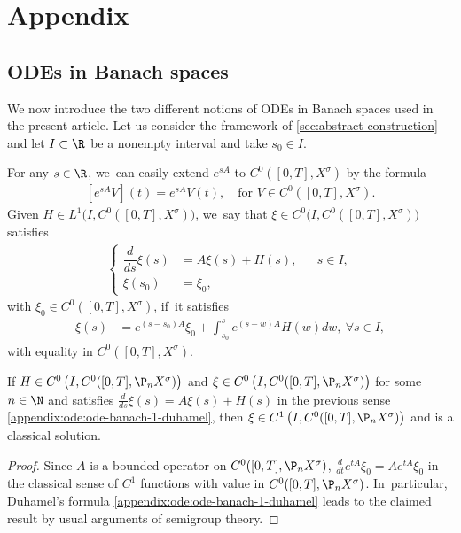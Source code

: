 \appendix
\setcounter{theorem}{0}
\renewcommand{\thetheorem}{A.\arabic{theorem}}
\renewcommand{\theequation}{A.\arabic{equation}}
\renewcommand{\thesubsection}{A.\arabic{subsection}}

\section*{Appendix}

\subsection{ODEs in Banach spaces} We now introduce the two different notions of ODEs in Banach spaces used in the present article. Let us consider the framework of \cref{sec:abstract-construction} and let $I\subset \R$ be a nonempty interval and take $s_0\in I$.

For any $s\in \R$, we~can easily extend $e^{sA}$ to $C^{0}([0,T],X^{\sigma})$ by the formula
\begin{align*}
\left[e^{sA}V\right](t)=e^{sA}V(t),\quad \text{for $V\in C^{0}([0,T],X^{\sigma})$.}
\end{align*}
Given $H\in L^{1}\big(I,C^{0}([0,T],X^{\sigma})\big)$, we~say that $\xi\in C^{0}\big(I,C^{0}([0,T],X^{\sigma})\big)$ satisfies
\begin{align}\label{appendix:ode:ode-banach-1}
\left\{\begin{aligned}
\dfrac{d}{ds}\xi(s)&=A \xi(s)+H(s), && s\in I, \\
\xi(s_0)&=\xi_0, &&
\end{aligned}\right.
\end{align}
with $\xi_0\in C^{0}([0,T],X^{\sigma})$, if~it satisfies
\begin{align}\label{appendix:ode:ode-banach-1-duhamel}
\xi(s)&=e^{(s-s_0)A}\xi_0+\int_{s_0}^{s}e^{(s-w)A}H(w)dw,\ \forall s\in I,
\end{align}
with equality in $C^{0}([0,T],X^{\sigma})$.
\begin{lemma}
\label{lmDuhamelCauchy}
If $H\in C^0\left(I,C^{0}([0,T],\P_{n}X^{\sigma})\right)$ and $\xi\in C^{0}\left(I,C^{0}([0,T],\P_{n}X^{\sigma})\right)$ for some $n\in\N$ and satisfies
$ \frac{d}{ds}\xi(s)=A \xi(s)+H(s)$ in the previous sense \eqref{appendix:ode:ode-banach-1-duhamel}, then $\xi\in C^{1}\left(I,C^{0}([0,T],\P_{n}X^{\sigma})\right)$ and is a classical solution.
\end{lemma}
\begin{proof}
Since $A$ is a bounded operator on $C^{0}([0,T],\P_{n}X^{\sigma})$, $\frac{d}{dt}e^{tA}\xi_0=A e^{tA}\xi_0$ in the classical sense of $C^1$ functions with value in $C^{0}([0,T],\P_{n}X^{\sigma})$. In~particular, Duhamel's formula \eqref{appendix:ode:ode-banach-1-duhamel} leads to the claimed result by usual arguments of semigroup theory.
\end{proof}

